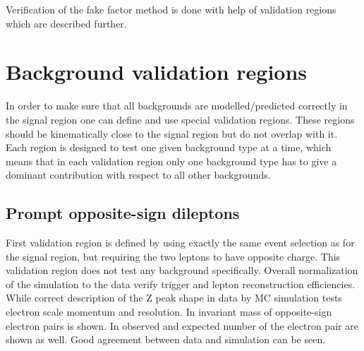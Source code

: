 Verification of the fake factor method is done with help of validation regions which are described further.






\section{Background validation regions}

In order to make sure that all backgrounds are modelled/predicted correctly in the signal region one can define and use special validation regions.
These regions should be kinematically close to the signal region but do not overlap with it. 
Each region is designed to test one given background type at a time,
which means that in each validation region only one background type has to give a dominant contribution with respect to all other backgrounds.

\subsection{Prompt opposite-sign dileptons}

First validation region is defined by using exactly the same event selection as for the signal region,
but requiring the two leptons to have opposite charge. 
This validation region does not test any background specifically.
Overall normalization of the simulation to the data verify trigger and lepton reconstruction efficiencies.
While correct description of the Z peak shape in data by MC simulation tests electron scale momentum and resolution.
In  invariant mass of opposite-sign electron pairs is shown.
In  observed and expected number of the electron pair are shown as well.
Good agreement between data and simulation can be seen.

